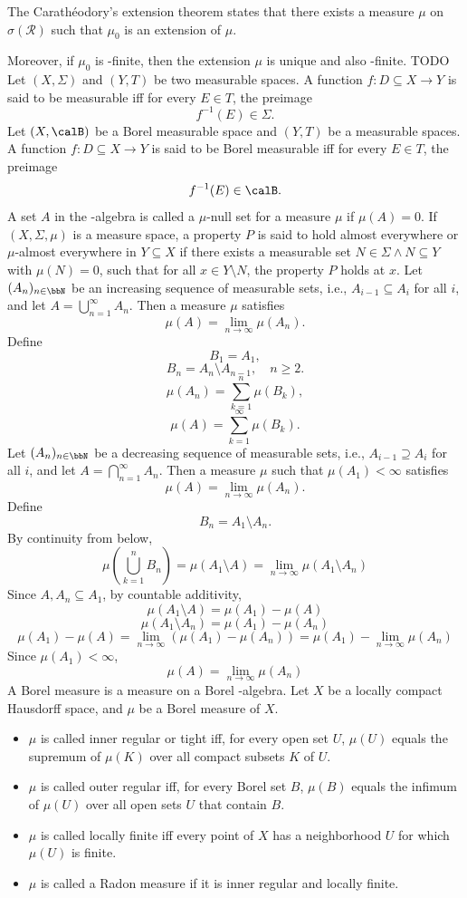 \documentclass[a4paper,12pt]{article}
\begin{document}
The Carathéodory's extension theorem states that there exists a measure $\mu$ on $\sigma(\mathcal{R})$ such that $\mu_0$ is an extension of $\mu$.

Moreover, if $\mu_0$ is \text{\textsigma}-finite, then the extension $\mu$ is unique and also \text{\textsigma}-finite.
\bpr
TODO
\epr
{}
Let $(X,\Sigma)$ and $(Y,T)$ be two measurable spaces. A function $f\colon D\subseteq X\to Y$ is said to be measurable iff for every $E\in T$, the preimage
\[f^{-1}(E)\in\Sigma.\]
Let $(X,\calB)$ be a Borel measurable space and $(Y,T)$ be a measurable spaces. A function $f\colon D\subseteq X\to Y$ is said to be Borel measurable iff for every $E\in T$, the preimage
\[f^{-1}(E)\in\calB.\]
A set $A$ in the \textsigma-algebra is called a $\mu$-null set for a measure $\mu$ if $\mu(A)=0$.
If $(X,\Sigma ,\mu)$ is a measure space, a property $P$ is said to hold almost everywhere or $\mu$-almost everywhere in $Y\subseteq X$ if there exists a measurable set $N\in \Sigma\land N\subseteq Y$ with $\mu (N)=0$, such that for all $x\in Y\setminus N$, the property $P$ holds at $x$.
Let $(A_n)_{n\in\bbN}$ be an increasing sequence of measurable sets, i.e., $A_{i-1}\subseteq A_i$ for all $i$, and let $A=\bigcup_{n=1}^{\infty}A_n$. Then a measure $\mu$ satisfies
\[\mu(A)=\lim_{n\to\infty}\mu(A_n).\]
\bpr
Define
\[B_1=A_1,\]
\[B_n=A_n\setminus A_{n-1},\quad n\ge 2.\]
\[\mu(A_n)=\sum_{k=1}^n\mu(B_k),\]
\[\mu(A)=\sum_{k=1}^{\infty}\mu(B_k).\]
\epr
{}
Let $(A_n)_{n\in\bbN}$ be a decreasing sequence of measurable sets, i.e., $A_{i-1}\supseteq A_i$ for all $i$, and let $A=\bigcap_{n=1}^{\infty}A_n$. Then a measure $\mu$ such that $\mu(A_1)<\infty$ satisfies
\[\mu(A)=\lim_{n\to\infty}\mu(A_n).\]
\bpr
Define
\[B_n=A_1\setminus A_n.\]
By continuity from below,
\[\mu(\bigcup_{k=1}^nB_n)=\mu(A_1\setminus A)=\lim_{n\to\infty}\mu(A_1\setminus A_n)\]
Since $A,A_n\subseteq A_1$, by countable additivity,
\[\mu(A_1\setminus A)=\mu(A_1)-\mu(A)\]
\[\mu(A_1\setminus A_n)=\mu(A_1)-\mu(A_n)\]
\[\mu(A_1)-\mu(A)=\lim_{n\to\infty}(\mu(A_1)-\mu(A_n))=\mu(A_1)-\lim_{n\to\infty}\mu(A_n)\]
Since $\mu(A_1)<\infty$,
\[\mu(A)=\lim_{n\to\infty}\mu(A_n)\]
\epr
{}
A Borel measure is a measure on a Borel \text{\textsigma}-algebra.
Let $X$ be a locally compact Hausdorff space, and $\mu$ be a Borel measure of $X$.
\begin{itemize}
\item $\mu$ is called inner regular or tight iff, for every open set $U$, $\mu(U)$ equals the supremum of $\mu(K)$ over all compact subsets $K$ of $U$.
\item $\mu$ is called outer regular iff, for every Borel set $B$, $\mu(B)$ equals the infimum of $\mu(U)$ over all open sets $U$ that contain $B$.
\item $\mu$ is called locally finite iff every point of $X$ has a neighborhood $U$ for which $\mu(U)$ is finite.
\item $\mu$ is called a Radon measure if it is inner regular and locally finite.
\end{itemize}
\end{document}
